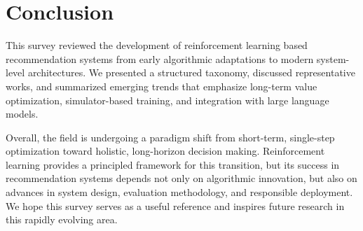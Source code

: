 \section{Conclusion}

This survey reviewed the development of reinforcement learning based recommendation systems from early algorithmic adaptations to modern system-level architectures. We presented a structured taxonomy, discussed representative works, and summarized emerging trends that emphasize long-term value optimization, simulator-based training, and integration with large language models.

Overall, the field is undergoing a paradigm shift from short-term, single-step optimization toward holistic, long-horizon decision making. Reinforcement learning provides a principled framework for this transition, but its success in recommendation systems depends not only on algorithmic innovation, but also on advances in system design, evaluation methodology, and responsible deployment. We hope this survey serves as a useful reference and inspires future research in this rapidly evolving area.
